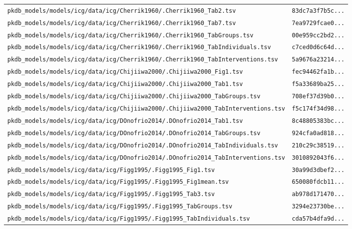 \documentclass{article}
\begin{document}
\begin{longtable}{ll}
\texttt{pkdb\_models/models/icg/data/icg/Cherrik1960/.Cherrik1960\_Tab2.tsv} & \texttt{83dc7a3f7b5c...} \\
\texttt{pkdb\_models/models/icg/data/icg/Cherrik1960/.Cherrik1960\_Tab7.tsv} & \texttt{7ea9729fcae0...} \\
\texttt{pkdb\_models/models/icg/data/icg/Cherrik1960/.Cherrik1960\_TabGroups.tsv} & \texttt{00e959cc2bd2...} \\
\texttt{pkdb\_models/models/icg/data/icg/Cherrik1960/.Cherrik1960\_TabIndividuals.tsv} & \texttt{c7ced0d6c64d...} \\
\texttt{pkdb\_models/models/icg/data/icg/Cherrik1960/.Cherrik1960\_TabInterventions.tsv} & \texttt{5a9676a23214...} \\
\texttt{pkdb\_models/models/icg/data/icg/Chijiiwa2000/.Chijiiwa2000\_Fig1.tsv} & \texttt{fec94462fa1b...} \\
\texttt{pkdb\_models/models/icg/data/icg/Chijiiwa2000/.Chijiiwa2000\_Tab1.tsv} & \texttt{f5a33689ba25...} \\
\texttt{pkdb\_models/models/icg/data/icg/Chijiiwa2000/.Chijiiwa2000\_TabGroups.tsv} & \texttt{708ef37d39b0...} \\
\texttt{pkdb\_models/models/icg/data/icg/Chijiiwa2000/.Chijiiwa2000\_TabInterventions.tsv} & \texttt{f5c174f34d98...} \\
\texttt{pkdb\_models/models/icg/data/icg/DOnofrio2014/.DOnofrio2014\_Tab1.tsv} & \texttt{8c48805383bc...} \\
\texttt{pkdb\_models/models/icg/data/icg/DOnofrio2014/.DOnofrio2014\_TabGroups.tsv} & \texttt{924cfa0ad818...} \\
\texttt{pkdb\_models/models/icg/data/icg/DOnofrio2014/.DOnofrio2014\_TabIndividuals.tsv} & \texttt{210c29c38519...} \\
\texttt{pkdb\_models/models/icg/data/icg/DOnofrio2014/.DOnofrio2014\_TabInterventions.tsv} & \texttt{3010892043f6...} \\
\texttt{pkdb\_models/models/icg/data/icg/Figg1995/.Figg1995\_Fig1.tsv} & \texttt{30a99d3dbef2...} \\
\texttt{pkdb\_models/models/icg/data/icg/Figg1995/.Figg1995\_Fig1mean.tsv} & \texttt{650080fdcb11...} \\
\texttt{pkdb\_models/models/icg/data/icg/Figg1995/.Figg1995\_Tab3.tsv} & \texttt{ab978d171470...} \\
\texttt{pkdb\_models/models/icg/data/icg/Figg1995/.Figg1995\_TabGroups.tsv} & \texttt{3294e23730be...} \\
\texttt{pkdb\_models/models/icg/data/icg/Figg1995/.Figg1995\_TabIndividuals.tsv} & \texttt{cda57b4dfa9d...} \\

\end{longtable}
\end{document}
